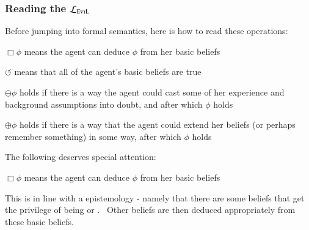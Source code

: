\begin{frame}[allowframebreaks]
\frametitle{Reading the $\mathcal{L}_{\text{\textsc{EviL}}}$}
\begin{itemizedot}
  \item Before jumping into formal semantics, here is how to read these
  operations:
  \begin{itemizeminus}
    \item[$\Box  \phi$ ] means the agent can deduce $\phi$ from her basic beliefs
    
    \item[$\circlearrowleft$ ] means that all of the agent's basic beliefs are
    true
    
    \item[$\ominus \phi$ ] holds if there is a way the agent could cast some of
    her experience and background assumptions into doubt, and after which
    $\phi$ holds
    
    \item[$\oplus \phi$ ] holds if there is a way that the agent could extend her
    beliefs (or perhaps remember something) in some way, after which $\phi$
    holds
  \end{itemizeminus}
\end{itemizedot}
\framebreak
\begin{itemizedot}
  \item The following deserves special attention:
  \begin{itemizeminus}
    \item[$\Box  \phi$ ] means the agent can deduce $\phi$ from her basic beliefs
  \end{itemizeminus}
  \item This is in line with a  epistemology -
  namely that there are some beliefs that get the privilege of being
  {} or {}. \ Other beliefs are then deduced
  appropriately from these basic beliefs.
  

\end{itemizedot}
\end{frame}
